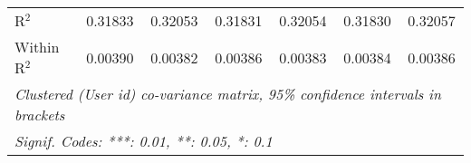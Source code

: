 \begin{table}[htbp]
\begin{threeparttable}[b]
\begin{tabular}{lcccccc}
         R$^2$                            & 0.31833          & 0.32053          & 0.31831          & 0.32054          & 0.31830          & 0.32057\\  
         Within R$^2$                     & 0.00390          & 0.00382          & 0.00386          & 0.00383          & 0.00384          & 0.00386\\  
         \midrule \midrule
         \multicolumn{7}{l}{\emph{Clustered (User id) co-variance matrix, 95\% confidence intervals in brackets}}\\
         \multicolumn{7}{l}{\emph{Signif. Codes: ***: 0.01, **: 0.05, *: 0.1}}\\
      \end{tabular}
   \end{threeparttable}
\end{table}


